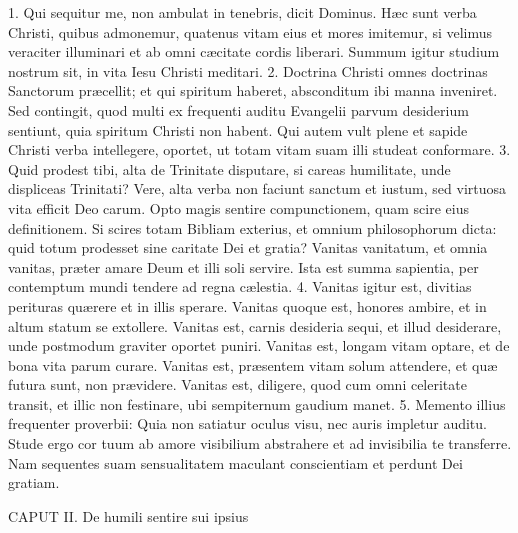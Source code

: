 




\thispagestyle{empty}





1. Qui sequitur me, non ambulat in tenebris, dicit Dominus. Hæc sunt verba Christi, quibus admonemur, quatenus vitam eius et mores imitemur, si velimus veraciter illuminari et ab omni cæcitate cordis liberari. Summum igitur studium nostrum sit, in vita Iesu Christi meditari.
2. Doctrina Christi omnes doctrinas Sanctorum præcellit; et qui spiritum haberet, absconditum ibi manna inveniret. Sed contingit, quod multi ex frequenti auditu Evangelii parvum desiderium sentiunt, quia spiritum Christi non habent. Qui autem vult plene et sapide Christi verba intellegere, oportet, ut totam vitam suam illi studeat conformare.
3. Quid prodest tibi, alta de Trinitate disputare, si careas humilitate, unde displiceas Trinitati? Vere, alta verba non faciunt sanctum et iustum, sed virtuosa vita efficit Deo carum. Opto magis sentire compunctionem, quam scire eius definitionem. Si scires totam Bibliam exterius, et omnium philosophorum dicta: quid totum prodesset sine caritate Dei et gratia? Vanitas vanitatum, et omnia vanitas, præter amare Deum et illi soli servire. Ista est summa sapientia, per contemptum mundi tendere ad regna cælestia.
4. Vanitas igitur est, divitias perituras quærere et in illis sperare. Vanitas quoque est, honores ambire, et in altum statum se extollere. Vanitas est, carnis desideria sequi, et illud desiderare, unde postmodum graviter oportet puniri. Vanitas est, longam vitam optare, et de bona vita parum curare. Vanitas est, præsentem vitam solum attendere, et quæ futura sunt, non prævidere. Vanitas est, diligere, quod cum omni celeritate transit, et illic non festinare, ubi sempiternum gaudium manet.
5. Memento illius frequenter proverbii: Quia non satiatur oculus visu, nec auris impletur auditu. Stude ergo cor tuum ab amore visibilium abstrahere et ad invisibilia te transferre. Nam sequentes suam sensualitatem maculant conscientiam et perdunt Dei gratiam.


CAPUT II.
De humili sentire sui ipsius


